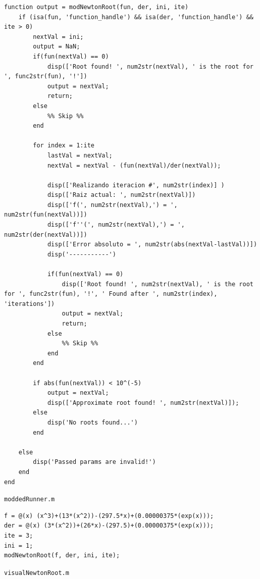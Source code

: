 \documentclass[english,notitlepage,letterpaper, 10pt]{article} %
\begin{document}
\begin{lstlisting}
function output = modNewtonRoot(fun, der, ini, ite)
    if (isa(fun, 'function_handle') && isa(der, 'function_handle') && ite > 0)
        nextVal = ini;
        output = NaN;
        if(fun(nextVal) == 0) 
            disp(['Root found! ', num2str(nextVal), ' is the root for ', func2str(fun), '!'])
            output = nextVal;
            return;
        else
            %% Skip %%
        end
        
        for index = 1:ite
            lastVal = nextVal;
            nextVal = nextVal - (fun(nextVal)/der(nextVal));

            disp(['Realizando iteracion #', num2str(index)] )
            disp(['Raiz actual: ', num2str(nextVal)])
            disp(['f(', num2str(nextVal),') = ', num2str(fun(nextVal))])
            disp(['f''(', num2str(nextVal),') = ', num2str(der(nextVal))])
            disp(['Error absoluto = ', num2str(abs(nextVal-lastVal))])
            disp('-----------')
            
            if(fun(nextVal) == 0) 
                disp(['Root found! ', num2str(nextVal), ' is the root for ', func2str(fun), '!', ' Found after ', num2str(index), 'iterations'])
                output = nextVal;
                return;
            else
                %% Skip %%
            end
        end

        if abs(fun(nextVal)) < 10^(-5)
            output = nextVal;
            disp(['Approximate root found! ', num2str(nextVal)]);
        else
            disp('No roots found...')
        end

    else
        disp('Passed params are invalid!')
    end
end 
\end{lstlisting}
\texttt{moddedRunner.m}
\begin{lstlisting}
f = @(x) (x^3)+(13*(x^2))-(297.5*x)+(0.00000375*(exp(x)));
der = @(x) (3*(x^2))+(26*x)-(297.5)+(0.00000375*(exp(x)));
ite = 3;
ini = 1;
modNewtonRoot(f, der, ini, ite);
\end{lstlisting}
\texttt{visualNewtonRoot.m}
\end{document}
